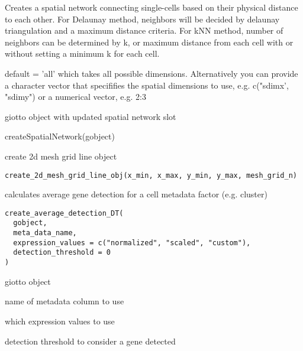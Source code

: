 \documentclass[a4paper]{book}
\begin{document}
%
\begin{Details}\relax
Creates a spatial network connecting single-cells based on their physical distance to each other.
For Delaunay method, neighbors will be decided by delaunay triangulation and a maximum distance criteria. For kNN method, number of neighbors can be determined by k, or maximum distance from each cell with or without
setting a minimum k for each cell.

 default = 'all' which takes all possible dimensions.
Alternatively you can provide a character vector that specififies the spatial dimensions to use, e.g. c("sdimx', "sdimy")
or a numerical vector, e.g. 2:3
\end{Details}
%
\begin{Value}
giotto object with updated spatial network slot
\end{Value}
%
\begin{Examples}
\begin{ExampleCode}
    createSpatialNetwork(gobject)
\end{ExampleCode}
\end{Examples}
%
\begin{Description}\relax
create 2d mesh grid line object
\end{Description}
%
\begin{Usage}
\begin{verbatim}
create_2d_mesh_grid_line_obj(x_min, x_max, y_min, y_max, mesh_grid_n)
\end{verbatim}
\end{Usage}
%
\begin{Description}\relax
calculates average gene detection for a cell metadata factor (e.g. cluster)
\end{Description}
%
\begin{Usage}
\begin{verbatim}
create_average_detection_DT(
  gobject,
  meta_data_name,
  expression_values = c("normalized", "scaled", "custom"),
  detection_threshold = 0
)
\end{verbatim}
\end{Usage}
%
\begin{Arguments}
\begin{ldescription}
\item[\code{gobject}] giotto object

\item[\code{meta\_data\_name}] name of metadata column to use

\item[\code{expression\_values}] which expression values to use

\item[\code{detection\_threshold}] detection threshold to consider a gene detected
\end{ldescription}
\end{Arguments}
\end{document}
